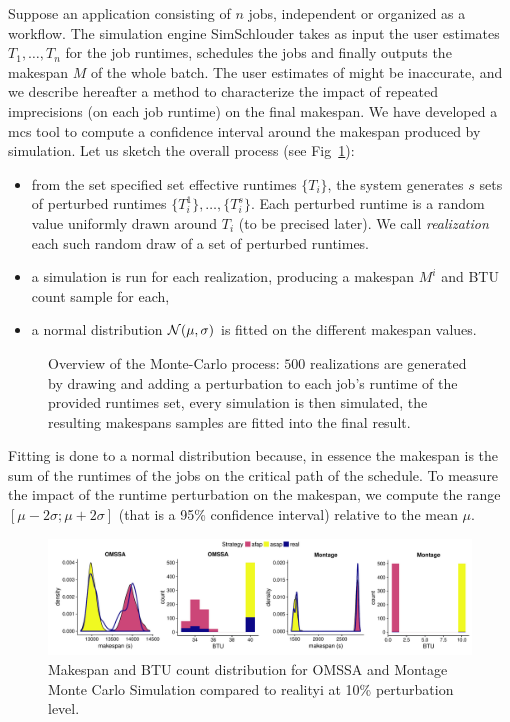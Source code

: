 \documentclass[10pt,conference,compsocconf]{IEEEtran}
\begin{document}
Suppose an  application consisting of  $n$ jobs,  independent or organized  as a
workflow.  The simulation engine SimSchlouder  takes as input the user estimates
$T_1, \ldots , T_n$ for the job runtimes, schedules the jobs and finally outputs
the makespan $M$ of the whole batch.  The user estimates of might be inaccurate,
and  we describe  hereafter  a method  to characterize  the  impact of  repeated
imprecisions (on each  job runtime) on the final makespan.   We have developed a
\ac{mcs} tool to  compute a confidence interval around the  makespan produced by
simulation.  Let us sketch the overall process (see Fig~\ref{fig:mc-process}):
\begin{itemize} 
\item  from the  set  specified  set effective  runtimes  $\{T_i\}$, the  system
  generates $s$ sets of perturbed runtimes $\{T_i^1\}, \ldots, \{T_i^s\}$.  Each
  perturbed  runtime is  a  random value  uniformly drawn  around  $T_i$ (to  be
  precised later). We call \emph{realization} each  such random draw of a set of
  perturbed runtimes.
\item a simulation  is run for each realization, producing  a makespan $M^i$ and
  BTU count sample for each,
\item a  normal distribution ${\cal  N}(\mu,\sigma)$ is fitted on  the different
  makespan values.
\end{itemize}
\begin{figure}
	\centering
	\resizebox{0.5\textwidth}{!}{%
		
		}
\caption{Overview of the Monte-Carlo process: $500$ realizations are generated
by drawing and adding a perturbation to each job's runtime of the provided
runtimes set, every simulation is then simulated, the resulting makespans
samples are fitted into the final result.}\label{fig:mc-process}
\end{figure}
Fitting is done to a normal distribution because, in essence the makespan is the
sum  of the  runtimes of  the jobs  on the  critical path  of the  schedule.  To
measure the impact  of the runtime perturbation on the  makespan, we compute the
range $[\mu-2\sigma;\mu+2\sigma]$ (that is  a 95\% confidence interval) relative
to  the mean  $\mu$. 

\begin{figure}
	\includegraphics[width=\textwidth]{gfx/fit_plot.pdf}
	\caption{Makespan and BTU count distribution for OMSSA and Montage Monte
	Carlo Simulation compared to realityi at 10\% perturbation
	level.}\label{fig:fit}
\end{figure}
\end{document}
